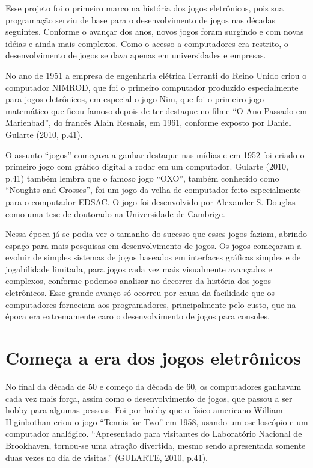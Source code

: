Esse projeto foi o primeiro marco na história dos jogos eletrônicos, pois sua programação serviu de base para o desenvolvimento de jogos nas décadas seguintes. Conforme o avançar dos anos, novos jogos foram surgindo e com novas idéias e ainda mais complexos. Como o acesso a computadores era restrito, o desenvolvimento de jogos se dava apenas em universidades e empresas.

No ano de 1951 a empresa de engenharia elétrica Ferranti do Reino Unido criou o computador NIMROD, que foi o primeiro computador produzido especialmente para jogos eletrônicos, em especial o jogo Nim, que foi o primeiro jogo matemático que ficou famoso depois de ter destaque no filme “O Ano Passado em Marienbad”, do francês Alain Resnais, em 1961, conforme exposto por Daniel Gularte (2010, p.41).

O assunto “jogos” começava a ganhar destaque nas mídias e em 1952 foi criado o primeiro jogo com gráfico digital a rodar em um computador. Gularte (2010, p.41) também lembra que o famoso jogo “OXO”, também conhecido como “Noughts and Crosses”, foi um jogo da velha de computador feito especialmente para o computador EDSAC. O jogo foi desenvolvido por Alexander S. Douglas como uma tese de doutorado na Universidade de Cambrige.
 
Nessa época já se podia ver o tamanho do sucesso que esses jogos faziam, abrindo espaço para mais pesquisas em desenvolvimento de jogos. Os jogos começaram a evoluir de simples sistemas de jogos baseados em interfaces gráficas simples e de jogabilidade limitada, para jogos cada vez mais visualmente avançados e complexos, conforme podemos analisar no decorrer da história dos jogos eletrônicos. Esse grande avanço só ocorreu por causa da facilidade que os computadores forneciam aos programadores, principalmente pelo custo, que na época era extremamente caro o desenvolvimento de jogos para consoles.

\section{Começa a era dos jogos eletrônicos}

No final da década de 50 e começo da década de 60, os computadores ganhavam cada vez mais força, assim como o desenvolvimento de jogos, que passou a ser hobby para algumas pessoas. Foi por hobby que o físico americano William Higinbothan criou o jogo “Tennis for Two” em 1958, usando um osciloscópio e um computador analógico. “Apresentado para visitantes do Laboratório Nacional de Brookhaven, tornou-se uma atração divertida, mesmo sendo apresentada somente duas vezes no dia de visitas.” (GULARTE, 2010, p.41). 

